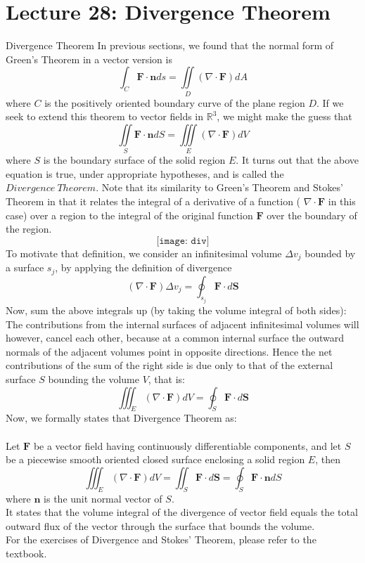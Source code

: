 \documentclass[10pt]{beamer}
\begin{document}
\section{Lecture 28: Divergence Theorem}
\begin{frame}[allowframebreaks]{Divergence Theorem}
In previous sections, we found that the {\color{red}normal form of Green's Theorem} in a vector version is 
$$\int_C\mathbf{F}\cdot\mathbf{n}ds = \iint\limits_D(\nabla\cdot\mathbf{F})dA$$
where $C$ is the positively oriented boundary curve of the plane region $D$. If we seek to extend this theorem to vector fields in $\mathbb{R}^3$, we might make the guess that 
$$\iint\limits_S\mathbf{F}\cdot\mathbf{n}dS = \iiint\limits_E(\nabla\cdot\mathbf{F})dV$$
where $S$ is the boundary surface of the solid region $E$. It turns out that the above equation is true, under appropriate hypotheses, and is called the $Divergence ~ Theorem$. {\color{blue}Note that its similarity
	to Green's Theorem and Stokes' Theorem in that it relates the integral of a derivative of a
	function ( $\nabla\cdot\mathbf{F}$ in this case) over a region to the integral of the original function $\mathbf{F}$ over the
	boundary of the region}.
$$\texttt{[image: div]}$$
To motivate that definition, we consider an infinitesimal  volume $\Delta v_j$ bounded by a surface $s_j$, by applying the definition of divergence
$$(\nabla\cdot\mathbf{F})\Delta v_{j} = \oint_{s_j}\mathbf{F}\cdot d\mathbf{S}$$$$$$$$$$$$$$
Now, sum the above integrals up (by taking the volume integral of both sides):\\
The contributions from the internal surfaces of adjacent infinitesimal volumes will however, cancel each other, because at a common internal surface the outward normals of the adjacent volumes point in opposite directions. Hence the net contributions of the sum of the right side is due only to that of the external surface $S$ bounding the volume $V$, that is:
$$\iiint_E(\nabla\cdot\mathbf{F})dV = \oint_S\mathbf{F}\cdot d\mathbf{S} $$$$$$$$$$$$$$
Now, we formally states that {\color{blue}Divergence Theorem} as:\\~
\\Let $\mathbf{F}$ be a vector field having continuously differentiable components, and let $S$
be a piecewise smooth oriented closed surface enclosing a solid region $E$, then
$$\iiint_E(\nabla\cdot\mathbf{F})dV = \iint_S\mathbf{F}\cdot d\mathbf{S} = \oint_S\mathbf{F}\cdot\mathbf
{n}dS$$
where $\mathbf{n}$ is the unit normal vector of $S$.\\
It states that {\color{red}the volume integral of the divergence of vector field equals the total outward flux of the vector through the surface that bounds the volume}.
$$$$
For the exercises of Divergence and Stokes' Theorem, please refer to the textbook.

\end{frame}
\end{document}
